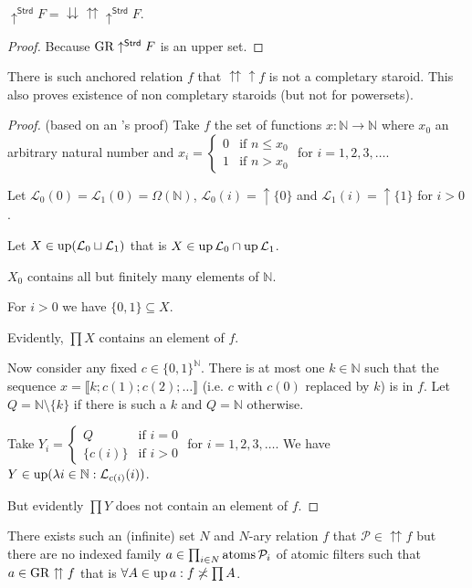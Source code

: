 \begin{prop}
$\uparrow^{\mathsf{Strd}}F=\downdownarrows\upuparrows\uparrow^{\mathsf{Strd}}F$.\end{prop}
\begin{proof}
Because $\operatorname{GR}\uparrow^{\mathsf{Strd}}F$ is an upper set.\end{proof}
\begin{example}
\label{non-completary}There is such anchored relation $f$ that $\upuparrows\uparrow f$
is not a completary staroid. This also proves existence of non completary
staroids (but not for powersets).\end{example}
\begin{proof}
(based on an 's proof) Take $f$ the set of functions
$x:\mathbb{N}\rightarrow\mathbb{N}$ where $x_{0}$ an arbitrary natural
number and $x_{i}=\left\{ \begin{array}{ll}
0 & \text{if }n\leqslant x_{0}\\
1 & \text{if }n>x_{0}
\end{array}\right.$ for $i=1,2,3,\ldots$.

Let $\mathcal{L}_{0}(0)=\mathcal{L}_{1}(0)=\Omega(\mathbb{N})$, $\mathcal{L}_{0}(i)=\uparrow\{0\}$
and $\mathcal{L}_{1}(i)=\uparrow\{1\}$ for $i>0$.

Let $X\in\operatorname{up}(\mathcal{L}_{0}\sqcup\mathcal{L}_{1})$ that is $X\in\operatorname{up}\mathcal{L}_{0}\cap\operatorname{up}\mathcal{L}_{1}$.

$X_{0}$ contains all but finitely many elements of $\mathbb{N}$.

For $i>0$ we have $\{0,1\}\subseteq X$.

Evidently, $\prod X$ contains an element of $f$.

Now consider any fixed $c\in\{0,1\}^{\mathbb{N}}$. There is at most
one $k\in\mathbb{N}$ such that the sequence $x=\llbracket k;c(1);c(2);\ldots\rrbracket$
(i.e. $c$ with $c(0)$ replaced by $k$) is in $f$. Let $Q=\mathbb{N}\setminus\{k\}$
if there is such a $k$ and $Q=\mathbb{N}$ otherwise.

Take $Y_{i}=\left\{ \begin{array}{ll}
Q & \text{if }i=0\\
\{c(i)\} & \text{if }i>0
\end{array}\right.$ for $i=1,2,3,\ldots$. We have $Y\in\operatorname{up}(\lambda i\in\mathbb{N}:\mathcal{L}_{c(i)}(i))$.

But evidently $\prod Y$ does not contain an element of $f$.\end{proof}
\begin{example}
There exists such an (infinite) set $N$ and $N$-ary relation $f$
that $\mathcal{P}\in\upuparrows f$ but there are no indexed family
$a\in\prod_{i\in N}\operatorname{atoms}\mathcal{P}_{i}$ of atomic filters such
that $a\in\operatorname{GR}\upuparrows f$ that is $\forall A\in\operatorname{up} a:f\not\asymp\prod A$.\end{example}
